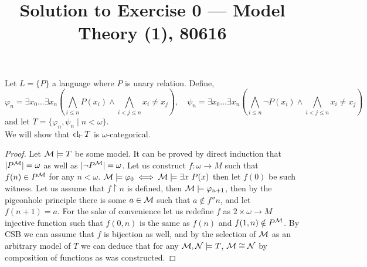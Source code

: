 
\title{Solution to Exercise 0 --- Model Theory (1), 80616}


\maketitle
\maketitleprint[yellow]

\question{}
Let $L = \{ P \}$ a language where $P$ is unary relation.
Define,
\[
	\varphi_n
	= \exists x_0 \ldots \exists x_n \left( \bigwedge_{i \le n} P(x_i) \land \bigwedge_{i < j \le n} x_i \ne x_j \right),
	\quad
	\psi_n
	= \exists x_0 \ldots \exists x_n \left( \bigwedge_{i \le n} \lnot P(x_i) \land \bigwedge_{i < j \le n} x_i \ne x_j \right)
\]
and let $T = \{ \varphi_n, \psi_n \mid n < \omega \}$. \\
We will show that $\operatorname{cl}_{\vdash} T$ is $\omega$-categorical.
\begin{proof}
	Let $\mathcal{M} \models T$ be some model.
	It can be proved by direct induction that $|P^{\mathcal{M}}| = \omega$ as well as $|\lnot P^{\mathcal{M}}| = \omega$.
	Let us construct $f : \omega \to M$ such that $f(n) \in P^{\mathcal{M}}$ for any $n < \omega$.
	$\mathcal{M} \models \varphi_0 \iff \mathcal{M} \models \exists x\ P(x)$ then let $f(0)$ be such witness.
	Let us assume that $f \restriction n$ is defined, then $\mathcal{M} \models \varphi_{n + 1}$, then by the pigeonhole principle there is some $a \in \mathcal{M}$ such that $a \notin f '' n$, and let $f(n + 1) = a$.
	For the sake of convenience let us redefine $f$ as $2 \times \omega \to M$ injective function such that $f(0, n)$ is the same as $f(n)$ and $f(1, n) \notin P^{\mathcal{M}}$.
	By CSB we can assume that $f$ is bijection as well, and by the selection of $\mathcal{M}$ as an arbitrary model of $T$ we can deduce that for any $\mathcal{M}, \mathcal{N} \models T$, $\mathcal{M} \cong \mathcal{N}$ by composition of functions as was constructed.
\end{proof}

